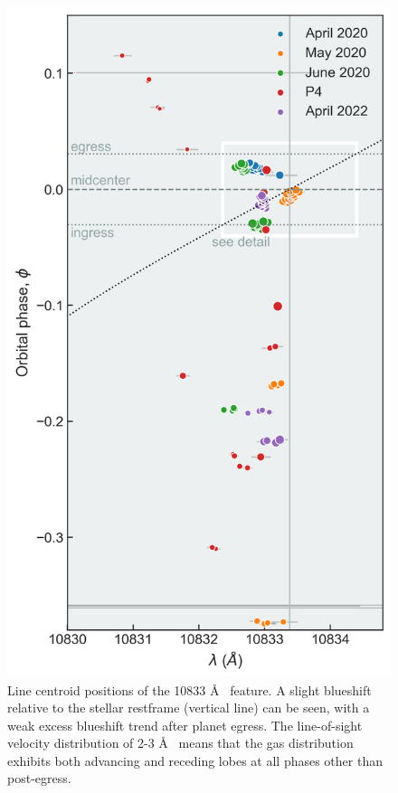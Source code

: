 \documentclass[twocolumn]{aastex631}
\begin{document}
\begin{figure}
    \centering
    \includegraphics[width=\linewidth]{figures/centroid_overview10833.png}
    \caption{Line centroid positions of the   10833 \AA~ feature.  A slight blueshift relative to the stellar restframe (vertical line) can be seen, with a weak excess blueshift trend after planet egress. The line-of-sight velocity distribution of 2-3 \AA~ means that the gas distribution exhibits both advancing and receding lobes at all phases other than post-egress.}
    \label{fig:centroids}
\end{figure}
\end{document}
